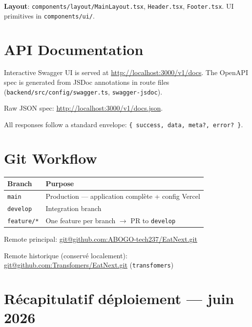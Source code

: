 \documentclass[11pt,a4paper]{article}
\begin{document}
\textbf{Layout}: \texttt{components/layout/MainLayout.tsx}, \texttt{Header.tsx},
\texttt{Footer.tsx}. UI primitives in \texttt{components/ui/}.

\section{API Documentation}

Interactive Swagger UI is served at \url{http://localhost:3000/v1/docs}.
The OpenAPI spec is generated from JSDoc annotations in route files
(\texttt{backend/src/config/swagger.ts}, \texttt{swagger-jsdoc}).

Raw JSON spec: \url{http://localhost:3000/v1/docs.json}.

All responses follow a standard envelope: \texttt{\{ success, data, meta?, error? \}}.

\section{Git Workflow}

\begin{tabular}{@{}ll@{}}
\toprule
\textbf{Branch} & \textbf{Purpose} \\
\midrule
\texttt{main} & Production --- application complète + config Vercel \\
\texttt{develop} & Integration branch \\
\texttt{feature/*} & One feature per branch $\rightarrow$ PR to \texttt{develop} \\
\bottomrule
\end{tabular}

\vspace{0.5em}
\noindent Remote principal:
\url{git@github.com:ABOGO-tech237/EatNext.git}

\noindent Remote historique (conservé localement):
\url{git@github.com:Transfomers/EatNext.git} (\texttt{transfomers})

\section{Récapitulatif déploiement --- juin 2026}
\label{sec:deploy-recap}
\end{document}
